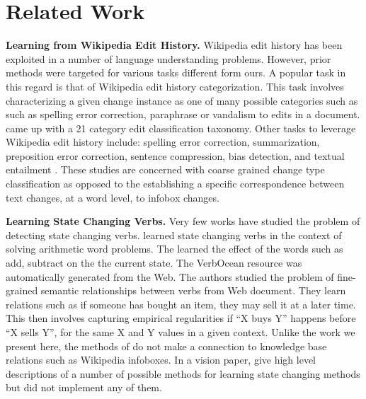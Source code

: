 \section{Related Work}

\textbf{Learning from Wikipedia Edit History.}
Wikipedia edit history has been exploited in a number
of language understanding problems.
However, prior methods were targeted for various tasks different form ours.
  A popular task in this regard is that of
Wikipedia edit history categorization\cite{daxenberger2013automatically}.  This task
involves characterizing  a given change instance as one of many possible categories such as
such as spelling error correction, paraphrase or vandalism to edits in a document. 
\cite{DaxenbergerG12}  came up with a 21 category edit classification
taxonomy.  Other tasks to leverage Wikipedia edit history include:
 spelling error correction, summarization, preposition error
 correction, sentence compression, bias detection, and
 textual  entailment \cite{Nelken08miningwikipedia,Cahill13robustsystems,Zanzotto_expandingtextual,RecasensDJ13}.
These studies are concerned with coarse grained change type classification as opposed
to the establishing a specific correspondence between text changes, at a word level,  to  infobox changes.

\textbf{Learning State Changing Verbs.}
Very few works have studied the problem of detecting state changing verbs.
\cite{HosseiniHEK14} learned state changing verbs in the context of solving arithmetic word problems.
The learned the effect of the words such as add, subtract on the the current state. 
The VerbOcean resource was automatically generated from the Web\cite{Chklovski04}. The authors  studied the problem of fine-grained semantic relationships between verbs from Web document. They learn relations such as  if someone has bought an item, they may sell it at a later time. This then involves capturing empirical regularities  if ``X buys Y'' happens before ``X
sells Y'', for the same X and Y values in a given context. Unlike the work we present here, the methods of \cite{Chklovski04,HosseiniHEK14}  do not make a connection to knowledge base relations such as Wikipedia infoboxes.
In a vision paper, \cite{Wijaya2014akbc} give high level descriptions of  a number of possible methods for learning state changing methods but did not implement any of them.
